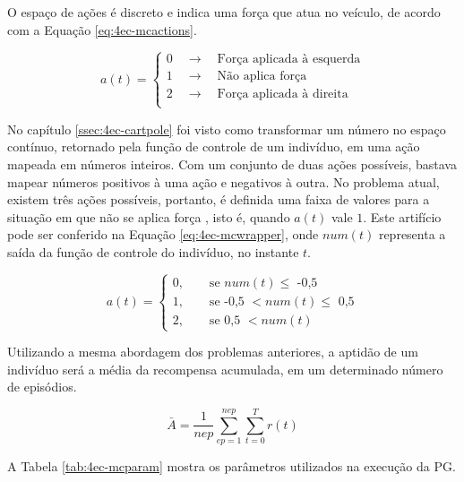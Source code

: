 O espaço de ações é discreto e indica uma força que atua no veículo, de acordo com a Equação \ref{eq:4ec-mcactions}.

\begin{equation}\label{eq:4ec-mcactions}
a(t) =
\begin{cases}
0 \quad \longrightarrow \quad \text{Força aplicada à esquerda}\\
1 \quad \longrightarrow \quad \text{Não aplica força}\\
2 \quad \longrightarrow \quad \text{Força aplicada à direita}\\
\end{cases}
\end{equation}

No capítulo \ref{ssec:4ec-cartpole} foi visto como transformar um número no espaço contínuo, retornado pela função de controle de um indivíduo, em uma ação mapeada em números inteiros. Com um conjunto de duas ações possíveis, bastava mapear números positivos à uma ação e negativos à outra. No problema atual, existem três ações possíveis, portanto, é definida uma faixa de valores para a situação em que não se aplica força , isto é, quando $a(t)$ vale $1$. Este artifício pode ser conferido na Equação \ref{eq:4ec-mcwrapper}, onde $num(t)$ representa a saída da função de controle do indivíduo, no instante $t$.

\begin{equation}\label{eq:4ec-mcwrapper}
	a(t)=\begin{cases}
	0,\qquad\text{se $num(t) \le$ -0,5}\\
	1,\qquad\text{se -0,5 $< num(t) \le$ 0,5}\\
	2,\qquad\text{se 0,5 $< num(t)$}
	\end{cases}
\end{equation}

Utilizando a mesma abordagem dos problemas anteriores, a aptidão de um indivíduo será a média da recompensa acumulada, em um determinado número de episódios.

\begin{equation}\label{eq:4ec-mcaptidao}
\bar{A} =
\dfrac{1}{nep}\sum_{ep=1}^{nep}\sum_{t=0}^{T} r(t)
\end{equation}

A Tabela \ref{tab:4ec-mcparam} mostra os parâmetros utilizados na execução da PG.

